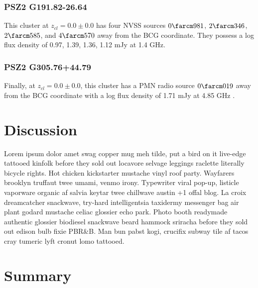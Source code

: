 \documentclass[apj, revtex4-1]{emulateapj}
\begin{document}
\subsubsection{PSZ2 G191.82-26.64}
This cluster at $z_{cl} = 0.0 \pm 0.0$ has four NVSS sources $0\farcm981$, $2\farcm346$, $2\farcm585$, and $4\farcm570$ away from the BCG coordinate. They possess a log flux density of 0.97, 1.39, 1.36, 1.12 mJy at 1.4 GHz. 

\subsubsection{PSZ2 G305.76+44.79}
Finally, at $z_{cl} = 0.0 \pm 0.0$, this cluster has a PMN radio source $0\farcm019$ away from the BCG coordinate with a log flux density of 1.71 mJy at 4.85 GHz \citep{Griffith1993}.



\section{Discussion}\label{sec:discussion}

Lorem ipsum dolor amet swag copper mug meh tilde, put a bird on it live-edge tattooed kinfolk before they sold out locavore selvage leggings raclette literally bicycle rights. Hot chicken kickstarter mustache vinyl roof party. Wayfarers brooklyn truffaut twee umami, venmo irony. Typewriter viral pop-up, listicle vaporware organic af salvia keytar twee chillwave austin +1 offal blog. La croix dreamcatcher snackwave, try-hard intelligentsia taxidermy messenger bag air plant godard mustache celiac glossier echo park. Photo booth readymade authentic glossier biodiesel snackwave beard hammock sriracha before they sold out edison bulb fixie PBR\&B. Man bun pabst kogi, crucifix subway tile af tacos cray tumeric lyft cronut lomo tattooed.

\section{Summary}\label{sec:summary}
\end{document}

